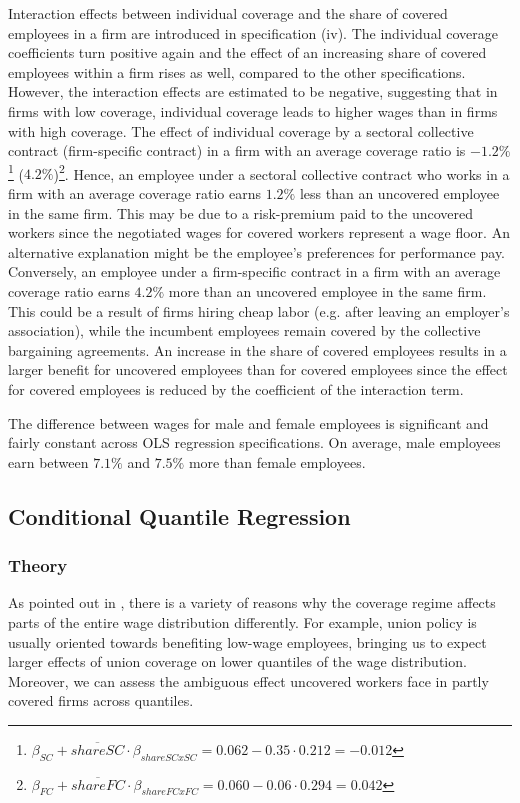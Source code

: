 Interaction effects between individual coverage and the share of covered employees in a firm are introduced in specification (iv). The individual coverage coefficients turn positive again and the effect of an increasing share of covered employees within a firm rises as well, compared to the other specifications. However, the interaction effects are estimated to be negative, suggesting that in firms with low coverage, individual coverage leads to higher wages than in firms with high coverage. The effect of individual coverage by a sectoral collective contract (firm-specific contract) in a firm with an average coverage ratio is $-1.2\%$\footnote{ $\beta_{SC}+\overline{shareSC}\cdot \beta_{shareSCxSC}=0.062- 0.35\cdot 0.212 =-0.012$} ($4.2\%$)\footnote{ $\beta_{FC}+\overline{shareFC}\cdot \beta_{shareFCxFC}=0.060-0.06 \cdot 0.294=0.042$}. Hence, an employee under a sectoral collective contract who works in a firm with an average coverage ratio earns $1.2\%$ less than an uncovered employee in the same firm. This may be due to a risk-premium paid to the uncovered workers since the negotiated wages for covered workers represent a wage floor. An alternative explanation might be the employee's preferences for performance pay. Conversely, an employee under a firm-specific contract in a firm with an average coverage ratio earns $4.2\%$ more than an uncovered employee in the same firm. This could be a result of firms hiring cheap labor (e.g. after leaving an employer's association), while the incumbent employees remain covered by the collective bargaining agreements. An increase in the share of covered employees results in a larger benefit for uncovered employees than for covered employees since the effect for covered employees is reduced by the coefficient of the interaction term.

The difference between wages for male and female employees is significant and fairly constant across OLS regression specifications. On average, male employees earn between $7.1\%$ and $7.5\%$ more than female employees.

\subsection{Conditional Quantile Regression}\label{cqrimplement}
\subsubsection*{Theory}
As pointed out in \cite{Fitzenberger&Kohn&Lembcke:13}, there is a variety of reasons why the coverage regime affects parts of the entire wage distribution differently. For example, union policy is usually oriented towards benefiting low-wage employees, bringing us to expect larger effects of union coverage on lower quantiles of the wage distribution. Moreover, we can assess the ambiguous effect uncovered workers face in partly covered firms across quantiles.

